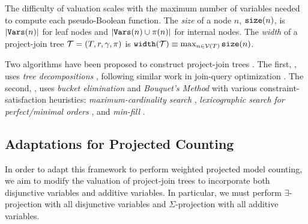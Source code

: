 The difficulty of valuation scales with the maximum number of variables needed to compute each pseudo-Boolean function. 
The \emph{size} of a node $n$, $\texttt{\upshape size}(n)$, is $\left| \texttt{\upshape Vars}(n) \right|$ for leaf nodes and $\left| \texttt{\upshape Vars}(n) \cup \pi(n) \right|$ for internal nodes.
The \emph{width} of a project-join tree $\mathcal{T} = (T, r, \gamma, \pi)$ is $\texttt{\upshape width}(\mathcal{T}) \equiv \max_{n \in \mathcal{V}(T)} \texttt{\upshape size}(n)$. 

Two algorithms have been proposed to construct project-join trees \cite{dudek2020dpmc}.
The first, \Lg{}, uses \emph{tree decompositions} \cite{robertson1991graph}, following similar work in join-query optimization \cite{dalmau2002constraint,mcmahan2004projection}. The second,
\htb{}, uses \emph{bucket elimination} \cite{dechter1999bucket} and \emph{Bouquet's Method} \cite{bouquet1999gestion} with various constraint-satisfaction heuristics:  \emph{maximum-cardinality search} \cite{tarjan1984simple}, \emph{lexicographic search for perfect/minimal orders} \cite{koster2001treewidth}, and \emph{min-fill} \cite{dechter2003constraint}.



\subsection{Adaptations for Projected Counting}
In order to adapt this framework to perform weighted projected model counting, we aim to modify the valuation of project-join trees to incorporate both disjunctive variables and additive variables. In particular, we must perform $\exists$-projection with all disjunctive variables and $\Sigma$-projection with all additive variables.


